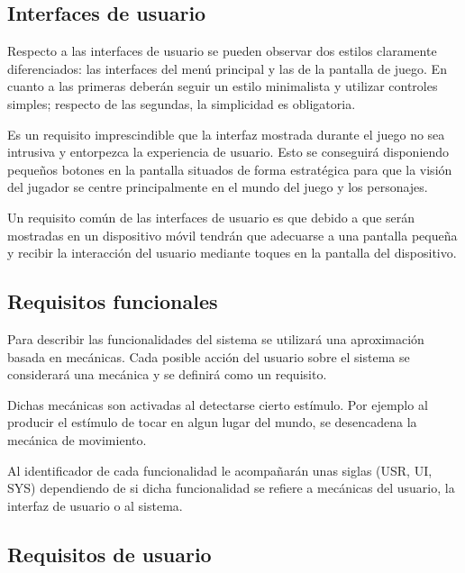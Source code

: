 \subsection{Interfaces de usuario}

Respecto a las interfaces de usuario se pueden observar dos estilos claramente diferenciados: las interfaces del menú principal y las de la pantalla de juego. En cuanto a las primeras deberán seguir un estilo minimalista y utilizar controles simples; respecto de las segundas, la simplicidad es obligatoria.

Es un requisito imprescindible que la interfaz mostrada durante el juego no sea intrusiva y entorpezca la experiencia de usuario. Esto se conseguirá disponiendo pequeños botones en la pantalla situados de forma estratégica para que la visión del jugador se centre principalmente en el mundo del juego y los personajes.

Un requisito común de las interfaces de usuario es que debido a que serán mostradas en un dispositivo móvil tendrán que adecuarse a una pantalla pequeña y recibir la interacción del usuario mediante toques en la pantalla del dispositivo.

\subsection{Requisitos funcionales}

Para describir las funcionalidades del sistema se utilizará una aproximación basada en mecánicas. Cada posible acción del usuario sobre el sistema se considerará una mecánica y se definirá como un requisito. 

Dichas mecánicas son activadas al detectarse cierto estímulo. Por ejemplo al producir el estímulo de tocar en algun lugar del mundo, se desencadena la mecánica de movimiento.

Al identificador de cada funcionalidad le acompañarán unas siglas (USR, UI, SYS) dependiendo de si dicha funcionalidad se refiere a mecánicas del usuario, la interfaz de usuario o al sistema.

\subsection{Requisitos de usuario}
\label{requisitosUsuario}

